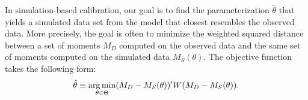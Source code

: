 \noindent In simulation-based calibration, our goal is to find the parameterization $\hat{\theta}$ that yields a simulated data set from the model that closest resembles the observed data. More precisely, the goal is often to minimize the weighted squared distance between a set of moments $M_D$ computed on the observed data and the same set of moments computed on the simulated data $M_S(\theta)$. The objective function takes the following form:
%
\begin{align*}
    \hat{\theta} \equiv \operatorname*{arg\,min}_{\theta \in \Theta} (M_D - M_S(\theta))' W (M_D - M_S(\theta)).
\end{align*}
